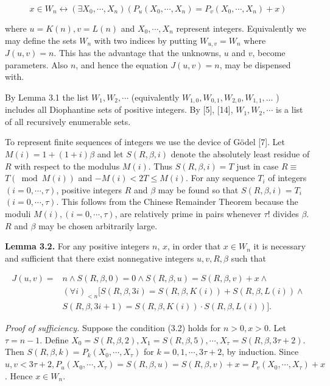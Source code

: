 \documentclass[11pt,a4paper]{article}
\begin{document}
$$
x \in W_{n} \leftrightarrow\left(\exists X_{0}, \cdots, X_{n}\right)\left(P_{u}\left(X_{0}, \cdots, X_{n}\right)=P_{v}\left(X_{0}, \cdots, X_{n}\right)+x\right)
$$

where $u=K(n), v=L(n)$ and $X_{0}, \cdots, X_{n}$ represent integers. Equivalently we may define the sets $W_{n}$ with two indices by putting $W_{u, v}=W_{n}$ where $J(u, v)=n$. This has the advantage that the unknowns, $u$ and $v$, become parameters. Also $n$, and hence the equation $J(u, v)=n$, may be dispensed with.

By Lemma 3.1 the list $W_{1}, W_{2}, \cdots$ (equivalently $W_{1,0},W_{0,1},W_{2,0},W_{1,1},\ldots$ ) includes all Diophantine sets of positive integers. By [5], [14], $W_{1}, W_{2}, \cdots$ is a list of all recursively enumerable sets.

To represent finite sequences of integers we use the device of Gödel [7]. Let $M(i)=1+(1+i) \beta$ and let $S(R, \beta, i)$ denote the absolutely least residue of $R$ with respect to the modulus $M(i)$. Thus $S(R, \beta, i)=T$ just in case $R \equiv$ $T(\bmod M(i))$ and $-M(i)<2 T \leq M(i)$. For any sequence $T_{i}$ of integers $(i=0, \cdots, \tau)$, positive integers $R$ and $\beta$ may be found so that $S(R, \beta, i)=T_{i}$ $(i=0, \cdots, \tau)$. This follows from the Chinese Remainder Theorem because the moduli $M(i),(i=0, \cdots, \tau)$, are relatively prime in pairs whenever $\tau!$ divides $\beta$. $R$ and $\beta$ may be chosen arbitrarily large.

\par{}\medskip\noindent\textbf{Lemma 3.2.} For any positive integers $n$, $x$, in order that $x \in W_{n}$ it is necessary and sufficient that there exist nonnegative integers $u, v, R, \beta$ such that


\begin{align*}
J(u, v)= & n \wedge S(R, \beta, 0)=0 \wedge S(R, \beta, u)=S(R, \beta, v)+x \wedge \\
& (\forall i)_{<n}[S(R, \beta, 3 i)=S(R, \beta, K(i))+S(R, \beta, L(i)) \wedge  \tag{3.2}\\
& S(R, \beta, 3 i+1)=S(R, \beta, K(i)) \cdot S(R,\beta,L(i))] .
\end{align*}


\noindent\textit{Proof of sufficiency.} Suppose the condition (3.2) holds for $n>0, x>0$. Let $\tau=n-1$. Define $X_{0}=S(R, \beta, 2), X_{1}=S(R, \beta, 5), \cdots, X_{\tau}=S(R, \beta, 3 \tau+2)$. Then $S(R, \beta, k)=P_{k}\left(X_{0}, \cdots, X_{\tau}\right)$ for $k=0,1, \cdots, 3 \tau+2$, by induction. Since $u, v<3 \tau+2, P_{u}\left(X_{0}, \cdots, X_{\tau}\right)=S(R, \beta, u)=S(R, \beta, v)+x=P_{v}\left(X_{0}, \cdots, X_{\tau}\right)+x$. Hence $x \in W_{n}$.
\end{document}
